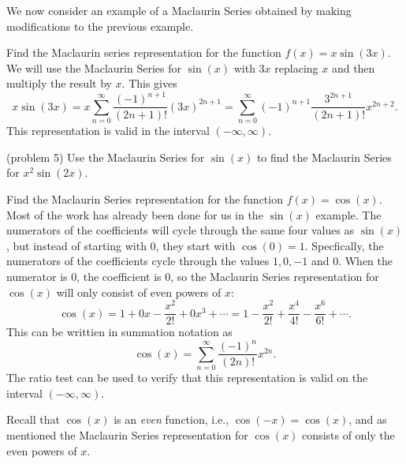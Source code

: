 \documentclass{ximera}
\begin{document}
We now consider an example of a Maclaurin Series obtained by making modifications to the previous example.


\begin{example}[example 5]
Find the Maclaurin series representation for the function $f(x) = x\sin(3x)$.\\
We will use the Maclaurin Series for $\sin(x)$ with $3x$ replacing $x$ and then multiply the result by $x$.
This gives
\[
x\sin(3x) = x \sum_{n=0}^\infty \frac{(-1)^{n+1}}{(2n+1)!}(3x)^{2n+1} = \sum_{n=0}^\infty (-1)^{n+1} \frac{3^{2n+1}}{(2n+1)!}x^{2n+2}.
\]
This representation is valid in the interval $(-\infty, \infty)$.
\end{example}


\begin{problem}(problem 5)
Use the Maclaurin Series for $\sin(x)$ to find the Maclaurin Series for $x^2 \sin(2x)$.
\begin{multipleChoice}
\end{multipleChoice}
\end{problem}

\begin{example} 
Find the Maclaurin Series representation for the function $f(x) = \cos(x)$.\\
Most of the work has already been done for us in the $\sin(x)$ example.  The numerators of the coefficients will cycle through the same
four values as $\sin(x)$, but instead of starting with 0, they start with $\cos(0) = 1$. 
Specfically, the numerators of the coefficients cycle through the values $1, 0, -1$ and $0$.  When the numerator is 0, the coefficient is 0,
so the Maclaurin Series representation for $\cos(x)$ will only consist of even powers of $x$:
\[
\cos(x) = 1 + 0x - \frac{x^2}{2!} + 0x^3 + \cdots = 1 - \frac{x^2}{2!} + \frac{x^4}{4!} - \frac{x^6}{6!} + \cdots.
\]
This can be writtien in summation notation as
\[
\cos(x) = \sum_{n=0}^\infty \frac{(-1)^n}{(2n)!}x^{2n}.
\]
The ratio test can be used to verify that this representation is valid on the interval $(-\infty, \infty)$.
\begin{remark}
Recall that $\cos(x)$ is an \textit{even} function, 
i.e., $\cos(-x) = \cos(x)$, and as mentioned the Maclaurin Series representation for $\cos(x)$ consists of only the 
even powers of $x$.
\end{remark} 
\end{example}
\end{document}
